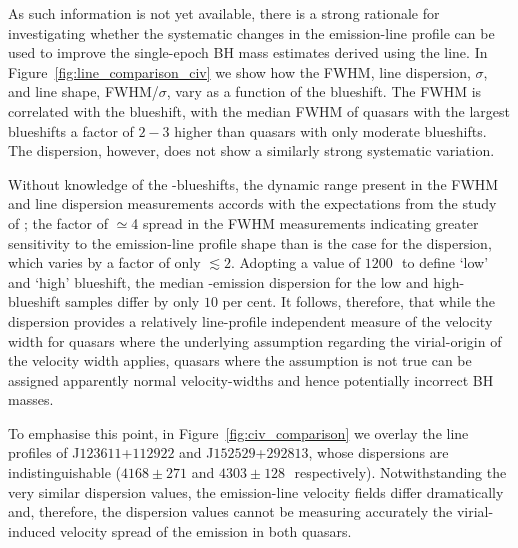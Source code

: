 As such information is not yet available, there is a strong rationale for investigating whether the systematic changes in the  emission-line profile can be used to improve the single-epoch BH mass estimates derived using the  line. 
In Figure~\ref{fig:line_comparison_civ} we show how the  FWHM, line dispersion, $\sigma$, and line shape, FWHM/$\sigma$, vary as a function of the blueshift. 
The  FWHM is correlated with the blueshift, with the median FWHM of quasars with the largest blueshifts a factor of $2-3$ higher than quasars with only moderate blueshifts.
The dispersion, however, does not show a similarly strong systematic variation. 

Without knowledge of the -blueshifts, the dynamic range present in the FWHM and line dispersion measurements accords with the expectations from the study of \citet{denney13}; the factor of $\simeq$4 spread in the FWHM measurements indicating greater sensitivity to the emission-line profile shape than is the case for the dispersion, which varies by a factor of only $\lesssim2$.
Adopting a value of $1200$\,\kms\, to define `low' and `high' blueshift, the median -emission dispersion for the low and high-blueshift samples differ by only $10$ per cent. 
It follows, therefore, that while the dispersion provides a relatively line-profile independent measure of the velocity width for quasars where the underlying assumption regarding the virial-origin of the velocity width applies, quasars where the assumption is not true can be assigned apparently normal velocity-widths and hence potentially incorrect BH masses. 

To emphasise this point, in Figure~\ref{fig:civ_comparison} we overlay the  line profiles of J$123611$+$112922$ and J$152529$+$292813$, whose dispersions are indistinguishable ($4168\pm271$ and $4303\pm128$\,\kms\, respectively). 
Notwithstanding the very similar dispersion values, the emission-line velocity fields differ dramatically and, therefore, the dispersion values cannot be measuring accurately the virial-induced velocity spread of the  emission in both quasars.

